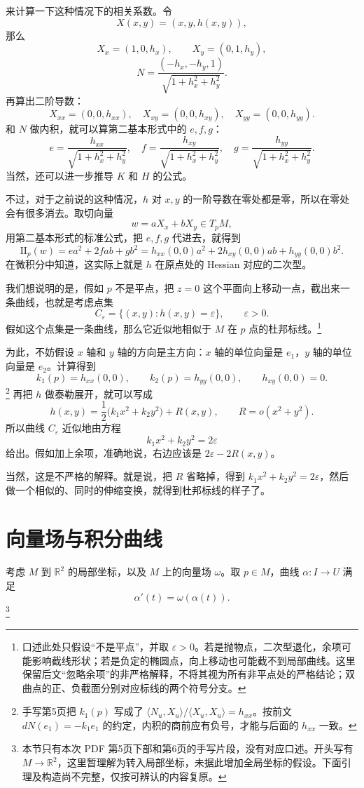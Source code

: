 \documentclass[UTF8,11pt,a4paper]{ctexart}
\newcommand{\ip}[2]{\langle #1,#2\rangle}
\newcommand{\II}{\mathrm{II}}
\begin{document}
来计算一下这种情况下的相关系数。令
\[
X(x,y)=(x,y,h(x,y)),
\]
那么
\[
X_x=(1,0,h_x),\qquad X_y=(0,1,h_y),
\]
\[
N=\frac{(-h_x,-h_y,1)}{\sqrt{1+h_x^2+h_y^2}}.
\]
再算出二阶导数：
\[
X_{xx}=(0,0,h_{xx}),\quad
X_{xy}=(0,0,h_{xy}),\quad
X_{yy}=(0,0,h_{yy}).
\]
和 $N$ 做内积，就可以算第二基本形式中的 $e,f,g$：
\[
e=\frac{h_{xx}}{\sqrt{1+h_x^2+h_y^2}},\quad
f=\frac{h_{xy}}{\sqrt{1+h_x^2+h_y^2}},\quad
g=\frac{h_{yy}}{\sqrt{1+h_x^2+h_y^2}}.
\]
当然，还可以进一步推导 $K$ 和 $H$ 的公式。

不过，对于之前说的这种情况，$h$ 对 $x,y$ 的一阶导数在零处都是零，所以在零处会有很多消去。取切向量
\[
w=aX_x+bX_y\in T_pM,
\]
用第二基本形式的标准公式，把 $e,f,g$ 代进去，就得到
\[
\II_p(w)=ea^2+2fab+gb^2
=h_{xx}(0,0)a^2+2h_{xy}(0,0)ab+h_{yy}(0,0)b^2.
\]
在微积分中知道，这实际上就是 $h$ 在原点处的 Hessian 对应的二次型。

我们想说明的是，假如 $p$ 不是平点，把 $z=0$ 这个平面向上移动一点，截出来一条曲线，也就是考虑点集
\[
C_\varepsilon=\{(x,y):h(x,y)=\varepsilon\},\qquad \varepsilon>0.
\]
假如这个点集是一条曲线，那么它近似地相似于 $M$ 在 $p$ 点的杜邦标线。\footnote{口述此处只假设“不是平点”，并取 $\varepsilon>0$。若是抛物点，二次型退化，余项可能影响截线形状；若是负定的椭圆点，向上移动也可能截不到局部曲线。这里保留后文“忽略余项”的非严格解释，不将其视为所有非平点处的严格结论；双曲点的正、负截面分别对应标线的两个符号分支。}

为此，不妨假设 $x$ 轴和 $y$ 轴的方向是主方向：$x$ 轴的单位向量是 $e_1$，$y$ 轴的单位向量是 $e_2$。计算得到
\[
k_1(p)=h_{xx}(0,0),\qquad k_2(p)=h_{yy}(0,0),\qquad h_{xy}(0,0)=0.
\]\footnote{手写第5页把 $k_1(p)$ 写成了 $\ip{N_u}{X_u}/\ip{X_u}{X_u}=h_{xx}$。按前文 $dN(e_1)=-k_1e_1$ 的约定，内积的商前应有负号，才能与后面的 $h_{xx}$ 一致。}
再把 $h$ 做泰勒展开，就可以写成
\[
h(x,y)=\frac12\bigl(k_1x^2+k_2y^2\bigr)+R(x,y),
\qquad R=o(x^2+y^2).
\]
所以曲线 $C_\varepsilon$ 近似地由方程
\[
k_1x^2+k_2y^2=2\varepsilon
\]
给出。假如加上余项，准确地说，右边应该是 $2\varepsilon-2R(x,y)$。

当然，这是不严格的解释。就是说，把 $R$ 省略掉，得到 $k_1x^2+k_2y^2=2\varepsilon$，然后做一个相似的、同时的伸缩变换，就得到杜邦标线的样子了。

\section{向量场与积分曲线}

考虑 $M$ 到 $\mathbb R^2$ 的局部坐标，以及 $M$ 上的向量场 $\omega$。取 $p\in M$，曲线 $\alpha\colon I\to U$ 满足
\[
\alpha'(t)=\omega(\alpha(t)).
\]\footnote{本节只有本次 PDF 第5页下部和第6页的手写片段，没有对应口述。开头写有 $M\to\mathbb R^2$，这里暂理解为转入局部坐标，未据此增加全局坐标的假设。下面引理及构造尚不完整，仅按可辨认的内容复原。}
\end{document}
